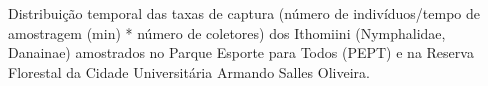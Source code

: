 \label{fig:2.1.3} Distribuição temporal das taxas de captura (número de indivíduos/tempo de amostragem (min) * número de coletores) dos Ithomiini (Nymphalidae, Danainae) amostrados no Parque Esporte para Todos (PEPT) e na Reserva Florestal da Cidade Universitária Armando Salles Oliveira.

